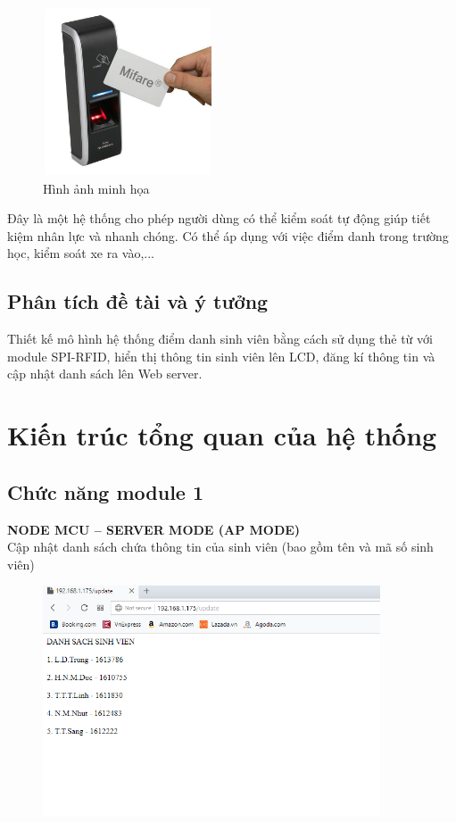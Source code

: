 \documentclass[12pt,titlepage,a4paper]{article}
\begin{document}
\vspace{1cm}
\begin{figure}[h!]
\begin{center}
\includegraphics[width=5cm]{1.png}
\caption{Hình ảnh minh họa}
\end{center}
\end{figure}
\vspace{1cm}


Đây là một hệ thống cho phép người dùng có thể kiểm soát tự động giúp tiết kiệm nhân lực và nhanh chóng. Có thể áp dụng với việc điểm danh trong trường học, kiểm soát xe ra vào,...
\subsection{Phân tích đề tài và ý tưởng}
Thiết kế mô hình hệ thống điểm danh sinh viên bằng cách sử dụng thẻ từ với module SPI-RFID, hiển thị thông tin sinh viên lên LCD, đăng kí thông tin và cập nhật danh sách lên Web server.

\newpage
\section{Kiến trúc tổng quan của hệ thống}
\subsection{Chức năng module 1}
\textbf{NODE MCU – SERVER MODE (AP MODE)}\\
Cập nhật danh sách chứa thông tin của sinh viên (bao gồm tên và mã số sinh viên)
\vspace{1cm}
\begin{figure}[h!]
\begin{center}
\includegraphics[width=10cm]{2.png}
\end{center}
\end{figure}
\vspace{1cm}
\end{document}
